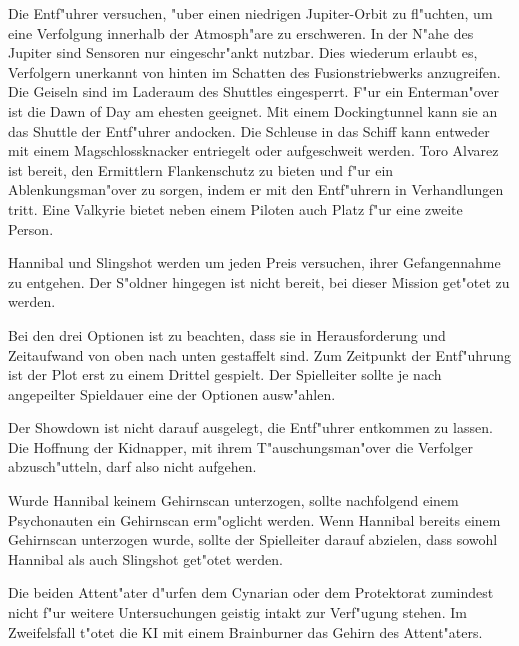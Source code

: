 Die Entf"uhrer versuchen, "uber einen niedrigen Jupiter-Orbit zu fl"uchten, um eine Verfolgung innerhalb der Atmosph"are zu erschweren. In der N"ahe des Jupiter sind Sensoren nur eingeschr"ankt nutzbar. Dies wiederum erlaubt es, Verfolgern unerkannt von hinten im Schatten des Fusionstriebwerks anzugreifen. Die Geiseln sind im Laderaum des Shuttles eingesperrt. F"ur ein Enterman"over ist die Dawn of Day am ehesten geeignet. Mit einem Dockingtunnel kann sie an das Shuttle der Entf"uhrer andocken. Die Schleuse in das Schiff kann entweder mit einem Magschlossknacker entriegelt oder aufgeschwei\3t werden. Toro Alvarez ist bereit, den Ermittlern Flankenschutz zu bieten und f"ur ein Ablenkungsman"over zu sorgen, indem er mit den Entf"uhrern in Verhandlungen tritt. Eine Valkyrie bietet neben einem Piloten auch Platz f"ur eine zweite Person.

Hannibal und Slingshot werden um jeden Preis versuchen, ihrer Gefangennahme zu entgehen. Der S"oldner hingegen ist nicht bereit, bei dieser Mission get"otet zu werden.

\vfill



\begin{remarks}
	Bei den drei Optionen ist zu beachten, dass sie in Herausforderung und Zeitaufwand von oben nach unten gestaffelt sind. Zum Zeitpunkt der Entf"uhrung ist der Plot erst zu einem Drittel gespielt. Der Spielleiter sollte je nach angepeilter Spieldauer eine der Optionen ausw"ahlen.

	Der Showdown ist nicht darauf ausgelegt, die Entf"uhrer entkommen zu lassen. Die Hoffnung der Kidnapper, mit ihrem T"auschungsman"over die Verfolger abzusch"utteln, darf also nicht aufgehen.
	
	Wurde Hannibal keinem Gehirnscan unterzogen, sollte nachfolgend einem Psychonauten ein Gehirnscan erm"oglicht werden. Wenn Hannibal bereits einem Gehirnscan unterzogen wurde, sollte der Spielleiter darauf abzielen, dass sowohl Hannibal als auch Slingshot get"otet werden.
	
	Die beiden Attent"ater d"urfen dem Cynarian oder dem Protektorat zumindest nicht f"ur weitere Untersuchungen geistig intakt zur Verf"ugung stehen. Im Zweifelsfall t"otet die KI mit einem Brainburner das Gehirn des Attent"aters.
\end{remarks}
